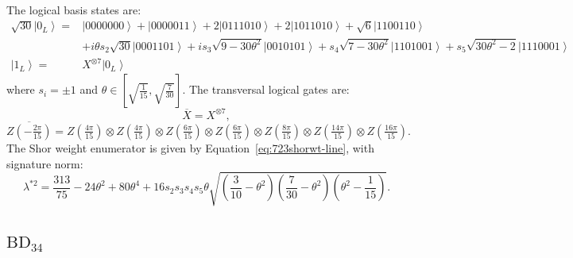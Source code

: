 \documentclass[8pt]{article}
\theoremstyle{definition}
\begin{document}
The logical basis states are:
\begin{align*}
    \sqrt{30}\left|0_{L}\right\rangle = & \left|0000000\right\rangle +\left|0000011\right\rangle +2\left|0111010\right\rangle +2\left|1011010\right\rangle +\sqrt{6}\left|1100110\right\rangle                                                                 \\
                                        & +i\theta s_{2}\sqrt{30}\left|0001101\right\rangle +is_{3}\sqrt{9-30\theta^{2}}\left|0010101\right\rangle +s_{4}\sqrt{7-30\theta^{2}}\left|1101001\right\rangle +s_{5}\sqrt{30\theta^{2}-2}\left|1110001\right\rangle \\
    \left|1_{L}\right\rangle =          & X^{\otimes7}\left|0_{L}\right\rangle
\end{align*}
where $s_i=\pm 1$ and $\theta\in \left[\sqrt{\frac{1}{15}},\sqrt{\frac{7}{30}}\right]$. The transversal logical gates are:
\[ \overline{X}=X^{\otimes7}, \]
\[ \overline{Z\left(-\tfrac{2\pi}{15}\right)}=Z\left(\tfrac{4\pi}{15}\right)\otimes Z\left(\tfrac{4\pi}{15}\right)\otimes Z\left(\tfrac{6\pi}{15}\right)\otimes Z\left(\tfrac{6\pi}{15}\right)\otimes Z\left(\tfrac{8\pi}{15}\right)\otimes Z\left(\tfrac{14\pi}{15}\right)\otimes Z\left(\tfrac{16\pi}{15}\right). \]
The Shor weight enumerator is given by Equation~\eqref{eq:723shorwt-line}, with signature norm:
\[ \lambda^{*2}=\frac{313}{75}-24\theta^{2}+80\theta^{4}+16s_{2}s_{3}s_{4}s_{5}\theta\sqrt{\left(\frac{3}{10}-\theta^{2}\right)\left(\frac{7}{30}-\theta^{2}\right)\left(\theta^{2}-\frac{1}{15}\right)}. \]

\subsection{\texorpdfstring{$\mathrm{BD}_{34}$}{BD₃₄}}
\end{document}
